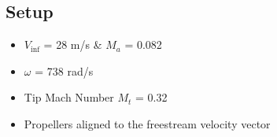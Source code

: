 \begin{frame}{\subsecname}
\begin{figure} [H]
\end{figure} 
\end{frame}

\subsection{Setup}
\begin{frame}{\subsecname}
\begin{itemize}
    \item $V_\inf$ = 28 m/s \& $M_a$ = 0.082
    \item $\omega$ = 738 rad/s
    \item Tip Mach Number \xrightarrow{} $M_t$ = 0.32 
    \item Propellers aligned to the freestream velocity vector
\end{itemize}
\end{frame}


